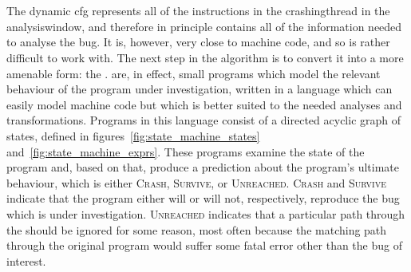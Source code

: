 \section{\STateMachines}
\label{sect:derive:state_machines}

The \gls{dynamic cfg} represents all of the instructions in the
\gls{crashingthread} in the \gls{analysiswindow}, and therefore in
principle contains all of the information needed to analyse the bug.
It is, however, very close to machine code, and so is rather difficult
to work with.  The next step in the algorithm is to convert it into a
more amenable form: the {\StateMachine}.  {\STateMachines} are, in
effect, small programs which model the relevant behaviour of the
program under investigation, written in a language which can easily
model machine code but which is better suited to the needed analyses
and transformations.  Programs in this language consist of a directed
acyclic graph of {\StateMachine} states, defined in
figures~\ref{fig:state_machine_states}
and~\ref{fig:state_machine_exprs}.  These {\StateMachine} programs
examine the state of the program and, based on that, produce a
prediction about the program's ultimate behaviour, which is either
\textsc{Crash}, \textsc{Survive}, or \textsc{Unreached}.
\textsc{Crash} and \textsc{Survive} indicate that the program either
will or will not, respectively, reproduce the bug which is under
investigation.  \textsc{Unreached} indicates that a particular path
through the {\StateMachine} should be ignored for some reason, most
often because the matching path through the original program would
suffer some fatal error other than the bug of interest.

